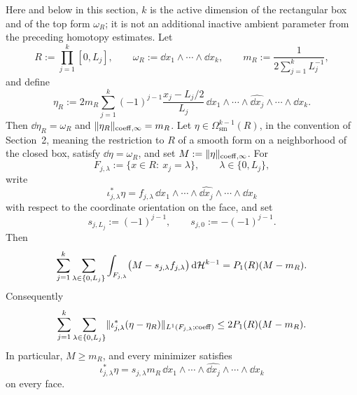 \begin{theorem}
\label{thm:box-boundary-stability}
Here and below in this section, $k$ is the active dimension of the rectangular
box and of the top form $\omega_R$; it is not an additional inactive ambient
parameter from the preceding homotopy estimates.
Let
\[
R:=\prod_{j=1}^k[0,L_j],
\qquad
\omega_R:=\dd x_1\wedge\cdots\wedge\dd x_k,
\qquad
m_R:=\frac{1}{2\sum_{j=1}^kL_j^{-1}},
\]
and define
\[
\eta_R:=
2m_R\sum_{j=1}^k(-1)^{j-1}
\frac{x_j-L_j/2}{L_j}\,
\dd x_1\wedge\cdots\wedge\widehat{\dd x_j}
\wedge\cdots\wedge\dd x_k .
\]
Then $\dd\eta_R=\omega_R$ and
$\lVert \eta_R \rVert_{\mathrm{coeff},\infty}=m_R$. Let
$\eta\in\Omega^{k-1}_{\mathrm{sm}}(R)$, in the convention of
Section~2, meaning the restriction to $R$ of a smooth form on a neighborhood of
the closed box, satisfy $\dd\eta=\omega_R$, and set
$M:=\lVert \eta \rVert_{\mathrm{coeff},\infty}$. For
\[
F_{j,\lambda}:=\{x\in R:\ x_j=\lambda\},
\qquad
\lambda\in\{0,L_j\},
\]
write
\[
\iota_{j,\lambda}^\ast\eta
=
f_{j,\lambda}\,
\dd x_1\wedge\cdots\wedge\widehat{\dd x_j}\wedge\cdots\wedge\dd x_k
\]
with respect to the coordinate orientation on the face, and set
\[
s_{j,L_j}:=(-1)^{j-1},
\qquad
s_{j,0}:=-(-1)^{j-1}.
\]
Then
\begin{equation}
\label{eq:box-boundary-deficit}
\sum_{j=1}^k\sum_{\lambda\in\{0,L_j\}}
\int_{F_{j,\lambda}}\bigl(M-s_{j,\lambda}f_{j,\lambda}\bigr)
\,\mathrm{d}\mathcal{H}^{k-1}
=
P_1(R)(M-m_R).
\end{equation}
Consequently
\begin{equation}
\label{eq:box-boundary-trace-stability}
\sum_{j=1}^k\sum_{\lambda\in\{0,L_j\}}
\lVert \iota_{j,\lambda}^\ast(\eta-\eta_R) \rVert_{L^1(F_{j,\lambda};\mathrm{coeff})}
\le
2P_1(R)(M-m_R).
\end{equation}
In particular, $M\ge m_R$, and every minimizer satisfies
\[
\iota_{j,\lambda}^\ast\eta
=
s_{j,\lambda}m_R\,
\dd x_1\wedge\cdots\wedge\widehat{\dd x_j}\wedge\cdots\wedge\dd x_k
\]
on every face.
\end{theorem}

